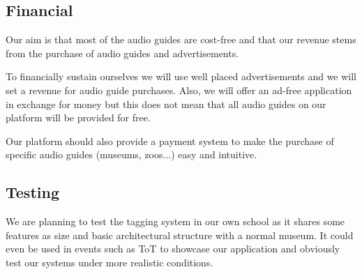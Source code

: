 \documentclass[12pt]{article}
\theoremstyle{definition}
\newenvironment{text}{
}{}
\begin{document}
\subsection{Financial}
\begin{text} 
Our aim is that most of the audio guides are cost-free and that our revenue stems from the purchase of audio guides and advertisements.\newline

To financially sustain ourselves we will use well placed advertisements and we will set a revenue for audio guide purchases. Also, we will offer an ad-free application in exchange for money but this does not mean that all audio guides on our platform will be provided for free.\newline

Our platform should also provide a payment system to make the purchase of specific audio guides (museums, zoos...) easy and intuitive. 
\end{text}

\subsection{Testing}
\begin{text}
We are planning to test the tagging system in our own school as it shares some features as size and basic architectural structure with a normal museum. It could even be used in events such as ToT to showcase our application and obviously test our systems under more realistic conditions.\newline
\end{text}
 
\pagebreak
\end{document}
